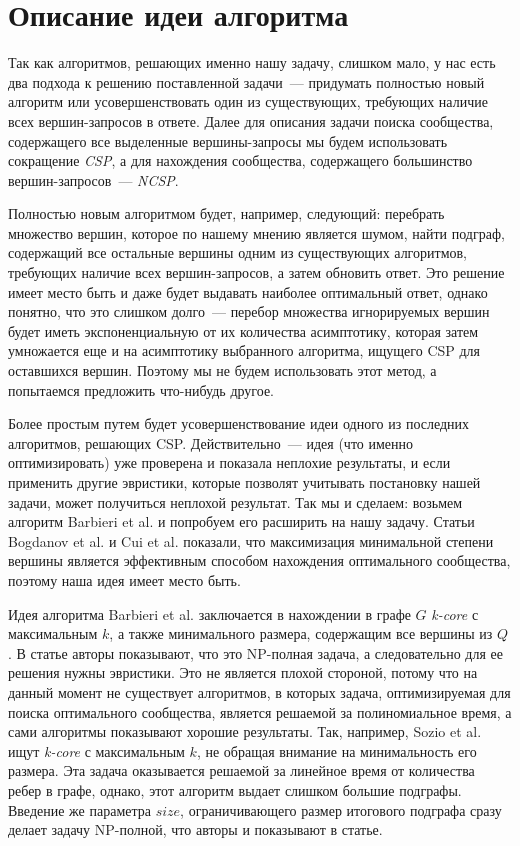 \documentclass[11pt,a4paper,oneside]{article}
\begin{document}
\section{Описание идеи алгоритма}

Так как алгоритмов, решающих именно нашу задачу, слишком мало, у нас есть два подхода к решению поставленной задачи~--- придумать полностью новый алгоритм или усовершенствовать один из существующих, требующих наличие всех вершин-запросов в ответе. Далее для описания задачи поиска сообщества, содержащего все выделенные вершины-запросы мы будем использовать сокращение \textit{CSP}, а для нахождения сообщества, содержащего большинство вершин-запросов~--- \textit{NCSP}.

Полностью новым алгоритмом будет, например, следующий: перебрать множество вершин, которое по нашему мнению является шумом, найти подграф, содержащий все остальные вершины одним из существующих алгоритмов, требующих наличие всех вершин-запросов, а затем обновить ответ. Это решение имеет место быть и даже будет выдавать наиболее оптимальный ответ, однако понятно, что это слишком долго~--- перебор множества игнорируемых вершин будет иметь экспоненциальную от их количества асимптотику, которая затем умножается еще и на асимптотику выбранного алгоритма, ищущего CSP для оставшихся вершин. Поэтому мы не будем использовать этот метод, а попытаемся предложить что-нибудь другое.

Более простым путем будет усовершенствование идеи одного из последних алгоритмов, решающих CSP. Действительно~--- идея (что именно оптимизировать) уже проверена и показала неплохие результаты, и если применить другие эвристики, которые позволят учитывать постановку нашей задачи, может получиться неплохой результат. Так мы и сделаем: возьмем алгоритм Barbieri et al. \cite{Barbieri15} и попробуем его расширить на нашу задачу. Статьи Bogdanov et al. \cite{Bogdanov13} и Cui et al. \cite{Cui14} показали, что максимизация минимальной степени вершины является эффективным способом нахождения оптимального сообщества, поэтому наша идея имеет место быть. 

Идея алгоритма Barbieri et al. \cite{Barbieri15} заключается в нахождении в графе $G$ \textit{k-core} с максимальным $k$, а также минимального размера, содержащим все вершины из $Q$. В статье авторы показывают, что это NP-полная задача, а следовательно для ее решения нужны эвристики. Это не является плохой стороной, потому что на данный момент не существует алгоритмов, в которых задача, оптимизируемая для поиска оптимального сообщества, является решаемой за полиномиальное время, а сами алгоритмы показывают хорошие результаты. Так, например, Sozio et al. \cite{Sozio10} ищут \textit{k-core} с максимальным $k$, не обращая внимание на минимальность его размера. Эта задача оказывается решаемой за линейное время от количества ребер в графе, однако, этот алгоритм выдает слишком большие подграфы. Введение же параметра $size$, ограничивающего размер итогового подграфа сразу делает задачу NP-полной, что авторы и показывают в статье.
\end{document}

